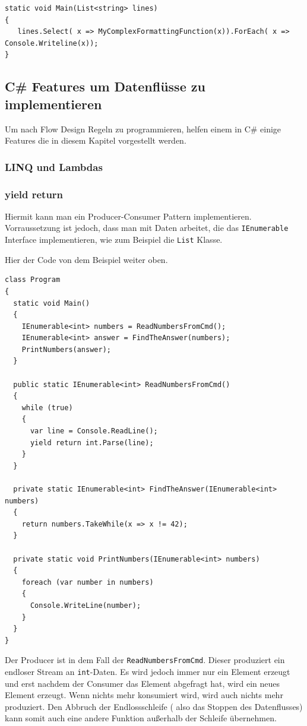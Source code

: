 \documentclass[11pt]{article}
\begin{document}
\begin{verbatim}
static void Main(List<string> lines)
{
   lines.Select( x => MyComplexFormattingFunction(x)).ForEach( x => Console.Writeline(x));
}
\end{verbatim}

\subsection{C\# Features um Datenflüsse zu implementieren}
\label{sec:orgheadline29}
Um nach Flow Design Regeln zu programmieren, helfen einem in C\# einige Features die in diesem Kapitel vorgestellt werden.

\subsubsection{LINQ und Lambdas}
\label{sec:orgheadline27}
\subsubsection{yield return}
\label{sec:orgheadline28}
Hiermit kann man ein Producer-Consumer Pattern implementieren.
Vorraussetzung ist jedoch, dass man mit Daten arbeitet, die das \texttt{IEnumerable} Interface implementieren, wie zum Beispiel die
\texttt{List} Klasse.

Hier der Code von dem Beispiel weiter oben.

\begin{verbatim}
class Program
{
  static void Main()
  {
    IEnumerable<int> numbers = ReadNumbersFromCmd();
    IEnumerable<int> answer = FindTheAnswer(numbers);
    PrintNumbers(answer);
  }

  public static IEnumerable<int> ReadNumbersFromCmd()
  {
    while (true)
    {
      var line = Console.ReadLine();
      yield return int.Parse(line);
    }
  }

  private static IEnumerable<int> FindTheAnswer(IEnumerable<int> numbers)
  {
    return numbers.TakeWhile(x => x != 42);
  }

  private static void PrintNumbers(IEnumerable<int> numbers)
  {
    foreach (var number in numbers)
    {
      Console.WriteLine(number);
    }
  }
}
\end{verbatim}

Der Producer ist in dem Fall der \texttt{ReadNumbersFromCmd}.
Dieser produziert ein endloser Stream an \texttt{int}-Daten.
Es wird jedoch immer nur ein Element erzeugt und erst nachdem der Consumer das
Element abgefragt hat, wird ein neues Element erzeugt.
Wenn nichts mehr konsumiert wird, wird auch nichts mehr produziert.
Den Abbruch der Endlossschleife ( also das Stoppen des Datenflusses) kann somit auch eine andere Funktion außerhalb der Schleife
übernehmen.
\end{document}
